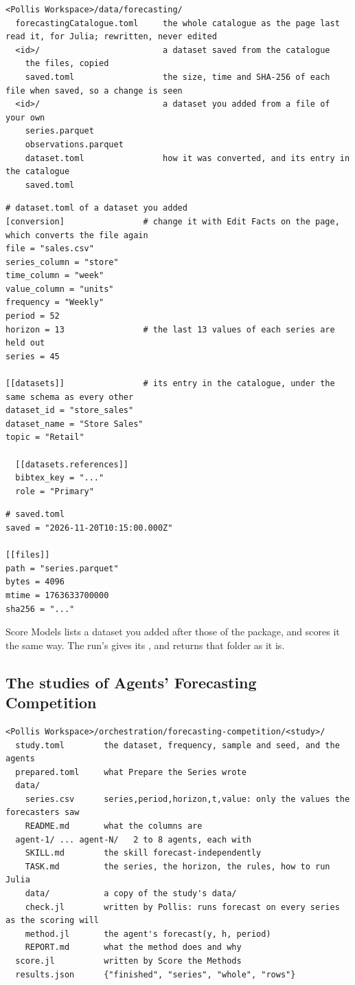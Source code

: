 \begin{lstlisting}
<Pollis Workspace>/data/forecasting/
  forecastingCatalogue.toml     the whole catalogue as the page last read it, for Julia; rewritten, never edited
  <id>/                         a dataset saved from the catalogue
    the files, copied
    saved.toml                  the size, time and SHA-256 of each file when saved, so a change is seen
  <id>/                         a dataset you added from a file of your own
    series.parquet
    observations.parquet
    dataset.toml                how it was converted, and its entry in the catalogue
    saved.toml
\end{lstlisting}

\begin{lstlisting}
# dataset.toml of a dataset you added
[conversion]                # change it with Edit Facts on the page, which converts the file again
file = "sales.csv"
series_column = "store"
time_column = "week"
value_column = "units"
frequency = "Weekly"
period = 52
horizon = 13                # the last 13 values of each series are held out
series = 45

[[datasets]]                # its entry in the catalogue, under the same schema as every other
dataset_id = "store_sales"
dataset_name = "Store Sales"
topic = "Retail"

  [[datasets.references]]
  bibtex_key = "..."
  role = "Primary"
\end{lstlisting}

\begin{lstlisting}
# saved.toml
saved = "2026-11-20T10:15:00.000Z"

[[files]]
path = "series.parquet"
bytes = 4096
mtime = 1763633700000
sha256 = "..."
\end{lstlisting}

Score Models lists a dataset you added after those of the package, and scores it the same way. The run's
 gives its , and  returns that folder as it is.

\subsection{The studies of Agents' Forecasting Competition}

\begin{lstlisting}
<Pollis Workspace>/orchestration/forecasting-competition/<study>/
  study.toml        the dataset, frequency, sample and seed, and the agents
  prepared.toml     what Prepare the Series wrote
  data/
    series.csv      series,period,horizon,t,value: only the values the forecasters saw
    README.md       what the columns are
  agent-1/ ... agent-N/   2 to 8 agents, each with
    SKILL.md        the skill forecast-independently
    TASK.md         the series, the horizon, the rules, how to run Julia
    data/           a copy of the study's data/
    check.jl        written by Pollis: runs forecast on every series as the scoring will
    method.jl       the agent's forecast(y, h, period)
    REPORT.md       what the method does and why
  score.jl          written by Score the Methods
  results.json      {"finished", "series", "whole", "rows"}
\end{lstlisting}


